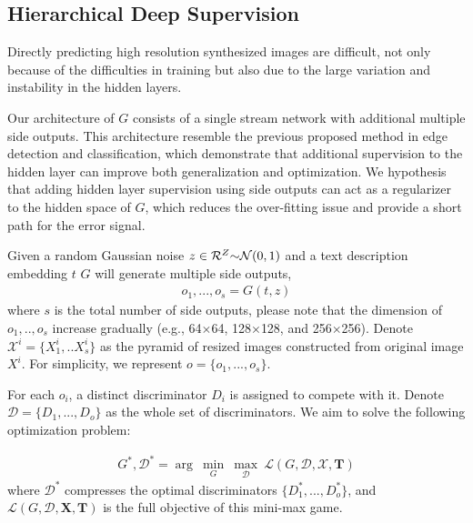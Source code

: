 \documentclass[10pt,twocolumn,letterpaper]{article}
\begin{document}
\subsection{Hierarchical Deep Supervision}
Directly predicting high resolution synthesized images are difficult, not only because of the difficulties in training but also due to the large variation and instability in the hidden layers.

Our architecture of $G$ consists of a single stream network with additional multiple side outputs. This architecture resemble the previous proposed method in edge detection\cite{xie2015holistically} and classification\cite{lee2015deeply}, which demonstrate that additional supervision to the hidden layer can improve both generalization and optimization.  We hypothesis that adding hidden layer supervision using side outputs can act as a regularizer to the hidden space of $G$, which reduces the over-fitting issue and provide a short path for the error signal.

Given a random Gaussian noise  $z\in \mathcal{R}^{Z} \scriptsize{\sim} \mathcal{N}(0,1)$ and a text description embedding $t$  $G$ will generate multiple side outputs,
\begin{equation}
\label{side}
\begin{split}
	o_1,...,o_s = G(t, z)	   
\end{split}
\end{equation}
where $s$ is the total number of side outputs, please note that the dimension of $o_1,..,o_s$ increase gradually (e.g., 64$\times$64, 128$\times$128, and 256$\times$256). Denote $\mathcal{X}^i = \{X^i_1, .. X^i_s\}$ as the pyramid of  resized images constructed from original image $X^i$.  For simplicity, we represent $o=\{o_1,...,o_s\}$.

For each $o_i$, a distinct discriminator $D_i$ is assigned to compete with it. Denote $\mathcal{D}=\{D_1, ..., D_o\}$ as the whole set of discriminators.
We aim to solve the following optimization problem:

\begin{equation}
\label{equ:optim}
\begin{split}
  G^*, \mathcal{D}^* = \arg~\underset{G}{\min}\ \underset{\mathcal{D}}{\max}~ \mathcal{L}(G,\mathcal{D}, \mathcal{X}, \bm{T})
\end{split}
\end{equation}
where $\mathcal{D}^*$ compresses the optimal discriminators $\{D_1^*, ..., D_o^*\}$, and $ \mathcal{L}(G,\mathcal{D}, \bm{X}, \bm{T} )$ is the full objective of this mini-max game.
\end{document}

